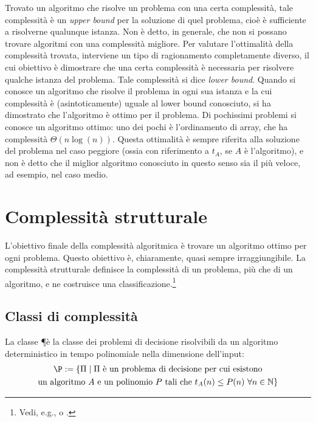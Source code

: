 Trovato un algoritmo che risolve un problema con una certa complessità, tale complessità è un \emph{upper bound} per la soluzione di quel problema, cioè è sufficiente a risolverne qualunque istanza.
Non è detto, in generale, che non si possano trovare algoritmi con una complessità migliore.
Per valutare l'ottimalità della complessità trovata, interviene un tipo di ragionamento completamente diverso, il cui obiettivo è dimostrare che una certa complessità è necessaria per risolvere qualche istanza del problema. Tale complessità si dice \emph{lower bound}.
Quando si conosce un algoritmo che risolve il problema in ogni sua istanza e la cui complessità è (asintoticamente) uguale al lower bound conosciuto, si ha dimostrato che l'algoritmo è ottimo per il problema.
Di pochissimi problemi si conosce un algoritmo ottimo: uno dei pochi è l'ordinamento di array, che ha complessità $\Theta(n\log(n))$.
Questa ottimalità è sempre riferita alla soluzione del problema nel caso peggiore (ossia con riferimento a $t_A$, se $A$ è l'algoritmo), e non è detto che il miglior algoritmo conosciuto in questo senso sia il più veloce, ad esempio, nel caso medio.



\section{Complessità strutturale}
L'obiettivo finale della complessità algoritmica è trovare un algoritmo ottimo per ogni problema.
Questo obiettivo è, chiaramente, quasi sempre irraggiungibile.
La complessità strutturale definisce la complessità di un problema, più che di un algoritmo, e ne costruisce una classificazione.\footnote{Vedi, e.g., \cite{Arora:09:computcompl} o \cite{complexityzoo}.}


\subsection{Classi di complessità}
\begin{defin}[\P]
	La classe \P è la classe dei problemi di decisione risolvibili da un algoritmo deterministico in tempo polinomiale nella dimensione dell'input:
	\begin{gather*}
		\P :=\{\Pi\mid \Pi\text{ è un problema di decisione per cui esistono}\\
		\text{un algoritmo $A$ e un polinomio $P$ tali che }t_A(n)\leq P(n)~\forall n\in\N\}
	\end{gather*}
\end{defin}

